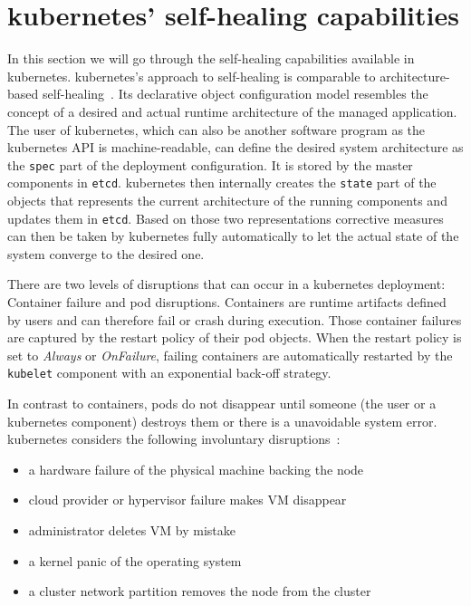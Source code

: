 
\section{\Gls{kubernetes}' self-healing capabilities}\label{sec:self-healing-kubernetes}
  In this section we will go through the self-healing capabilities available in \gls{kubernetes}.
  \gls{kubernetes}'s approach to self-healing is comparable to architecture-based self-healing~\cite{ToffettiMicroservices,DashofyArchitecture}.
  Its declarative object configuration model resembles the concept of a desired and actual runtime architecture of the managed application.
  The user of \gls{kubernetes}, which can also be another software program as the \gls{kubernetes} API is machine-readable, can define the desired system architecture as the \texttt{spec} part of the deployment configuration.
  It is stored by the master components in \texttt{etcd}.
  \Gls{kubernetes} then internally creates the \texttt{state} part of the objects that represents the current architecture of the running components and updates them in \texttt{etcd}.
  Based on those two representations corrective measures can then be taken by \gls{kubernetes} fully automatically to let the actual state of the system converge to the desired one.

  There are two levels of disruptions that can occur in a \gls{kubernetes} deployment: Container failure and pod disruptions.
  Containers are runtime artifacts defined by users and can therefore fail or crash during execution.
  Those container failures are captured by the restart policy of their pod objects.
  When the restart policy is set to \textit{Always} or \textit{OnFailure}, failing containers are automatically restarted by the \texttt{kubelet} component with an exponential back-off strategy.

  In contrast to containers, pods do not disappear until someone (the user or a \gls{kubernetes} component) destroys them or there is a unavoidable system error.
  \Gls{kubernetes} considers the following involuntary disruptions~\cite{kubernetes}:

  \begin{itemize}
    \item a hardware failure of the physical machine backing the node
    \item cloud provider or hypervisor failure makes VM disappear
    \item administrator deletes VM by mistake
    \item a kernel panic of the operating system
    \item a cluster network partition removes the node from the cluster
  \end{itemize}

